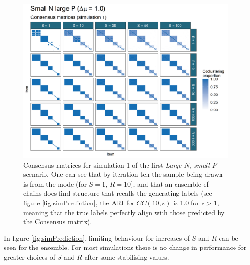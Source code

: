 \documentclass[]{article}
\begin{document}
\begin{figure} %
	\centering
	\includegraphics[scale=0.65]{./Images/Simulations/CMs/small_n_large_p_baseSim1.png}
	\caption{Consensus matrices for simulation 1 of the first \emph{Large $N$, small $P$} scenario. One can see that by iteration ten the sample being drawn is from the mode (for $S=1$, $R = 10$), and that an ensemble of chains does find structure that recalls the generating labels (see figure \ref{fig:simPrediction}, the ARI for $CC(10, s)$ is 1.0 for $s > 1$, meaning that the true labels perfectly align with those predicted by the Consensus matrix).}
	\label{fig:simSmallNLargePCMs}
\end{figure}

In figure \ref{fig:simPrediction}, limiting behaviour for increases of $S$ and $R$ can be seen for the ensemble. For most simulations there is no change in performance for greater choices of $S$ and $R$ after some stabilising values.
\end{document}
